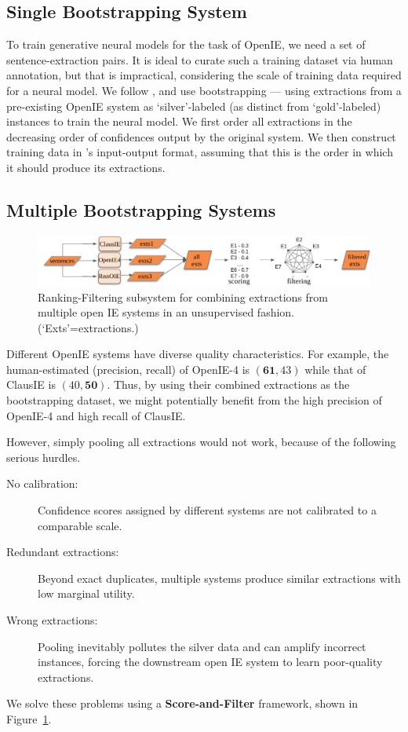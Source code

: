     \subsection{Single Bootstrapping System}

        To train generative neural models for the task of OpenIE, we need a set of sentence-extraction pairs. It is ideal to curate such a training dataset via human annotation, but that is impractical, considering the scale of training data required for a neural model. We follow \citet{cui&al18}, and use  bootstrapping --- using extractions from a pre-existing OpenIE system as `silver'-labeled (as distinct from `gold'-labeled) instances to train the neural model. We first order all extractions in the decreasing order of confidences output by the original system. We then construct training data in \shortname's input-output format, assuming that this is the order in which it should produce its extractions.

    \subsection{Multiple Bootstrapping Systems}

        \begin{figure}[h]
            \includegraphics[width=.99\hsize]{images/imojie/score_filter.png}
            \caption{Ranking-Filtering subsystem for combining extractions from multiple open IE systems in an unsupervised fashion.  (`Exts'=extractions.)}
            \label{fig:score_filter}
        \end{figure}

        Different OpenIE systems have diverse quality characteristics. For example, the human-estimated (precision, recall) of OpenIE-4 is $(\textbf{61},43)$ while that of ClausIE is $(40,\textbf{50})$. Thus, by using their combined extractions as the bootstrapping dataset, we might potentially benefit from the high precision of OpenIE-4 and high recall of ClausIE.

        However, simply pooling all extractions would not work, because of the following serious hurdles.
        \begin{description}
        \item[No calibration:] Confidence scores assigned by different systems are not calibrated to a comparable scale.
        \item[Redundant extractions:] Beyond exact duplicates, multiple systems produce similar extractions with low marginal utility.
        \item[Wrong extractions:] Pooling inevitably pollutes the silver data and can amplify incorrect instances, forcing the downstream open IE system to learn poor-quality extractions.
        \end{description}
        We solve these problems using a \textbf{Score-and-Filter} framework, shown in Figure~\ref{fig:score_filter}.

